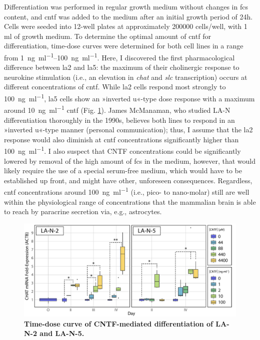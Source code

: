 Differentiation was performed in regular growth medium without changes in \ac{fcs} content, and \ac{cntf} was added to the medium after an initial growth period of 24h. Cells were seeded into 12-well plates at approximately \num{200000} cells/well, with 1 ml of growth medium. To determine the optimal amount of \ac{cntf} for differentiation, time-dose curves were determined for both cell lines in a range from \SIrange{1}{100}{\nano\gram\per\milli\litre}. Here, I discovered the first pharmacological difference between \ac{la2} and \ac{la5}: the maximum of their cholinergic response to neurokine stimulation (i.e., an elevation in \textit{\ac{chat}} and \textit{\ac{slc}} transcription) occurs at different concentrations of \ac{cntf}. While \ac{la2} cells respond most strongly to \SI{100}{\nano\gram\per\milli\litre}, \ac{la5} cells show an »inverted u«-type dose response with a maximum around \SI{10}{\nano\gram\per\milli\litre} \ac{cntf} (Fig. \ref{fig:time-dose}). James McManaman, who studied LA-N differentiation thoroughly in the 1990s\cite{McManaman1991}, believes both lines to respond in an »inverted u«-type manner (personal communication); thus, I assume that the \ac{la2} response would also diminish at \ac{cntf} concentrations significantly higher than \SI{100}{\nano\gram\per\milli\litre}. I also suspect that CNTF concentrations could be significantly lowered by removal of the high amount of \ac{fcs} in the medium, however, that would likely require the use of a special serum-free medium, which would have to be established up front, and might have other, unforeseen consequences. Regardless, \ac{cntf} concentrations around \SI{100}{\nano\gram\per\milli\litre} (i.e., pico- to nano-molar) still are well within the physiological range of concentrations that the mammalian brain is able to reach by paracrine secretion via, e.g., astrocytes\cite{Sun2016}.

\begin{figure}
\includegraphics[width=\textwidth]{figures/time-dose}
\caption[Time-dose curve, LA-N-2 and LA-N-5.]{\textbf{Time-dose curve of CNTF-mediated differentiation of LA-N-2 and LA-N-5.}
\label{fig:time-dose}}
\end{figure}

